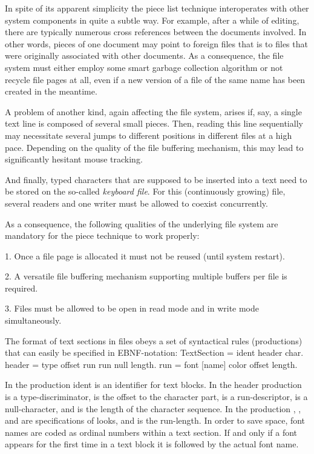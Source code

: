 In spite of its apparent simplicity the piece list technique interoperates with other system components in quite a subtle way. For example, after a while of editing, there are typically numerous cross references between the documents involved. In other words, pieces of one document may point to foreign files that is to files that were originally associated with other documents. As a consequence, the file system must either employ some smart garbage collection algorithm or not recycle file pages at all, even if a new version of a file of the same name has been created in the meantime.

A problem of another kind, again affecting the file system, arises if, say, a single text line is composed of several small pieces. Then, reading this line sequentially may necessitate several jumps to different positions in different files at a high pace. Depending on the quality of the file buffering mechanism, this may lead to significantly hesitant mouse tracking.

And finally, typed characters that are supposed to be inserted into a text need to be stored on the so-called \emph{keyboard file}. For this (continuously growing) file, several readers and one writer must be allowed to coexist concurrently.

As a consequence, the following qualities of the underlying file system are mandatory for the piece technique to work properly:

1. Once a file page is allocated it must not be reused (until system restart).

2. A versatile file buffering mechanism supporting multiple buffers per file is required.

3. Files must be allowed to be open in read mode and in write mode simultaneously.

\noindent The format of text sections in files obeys a set of syntactical rules (productions) that can easily be specified in EBNF-notation:
\begintt
TextSection = ident header {char}.
header = type offset run {run} null length.
run = font [name] color offset length.
\endtt

\noindent In the  production ident is an identifier for text blocks. In the header production  is a type-discriminator, 
is the offset to the character part,  is a run-descriptor,  is
a null-character, and  is the length of the character
sequence. In the  production , , and  are
specifications of looks, and  is the run-length. In order to
save space, font names are coded as ordinal numbers within a text
section. If and only if a font appears for the first time in a text
block it is followed by the actual font name.


